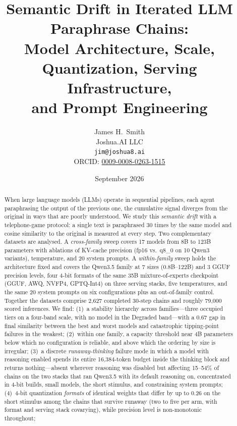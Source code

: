 \documentclass[11pt]{article}
\title{Semantic Drift in Iterated LLM Paraphrase Chains:\\
Model Architecture, Scale, Quantization, Serving Infrastructure,\\
and Prompt Engineering}
\author{
  James H.\ Smith \\
  Joshua.AI LLC \\
  \texttt{jim@joshua8.ai} \\
  ORCID: \href{https://orcid.org/0009-0008-0263-1515}{0009-0008-0263-1515}
}
\date{September 2026}
\begin{document}
\maketitle

\begin{abstract}
When large language models (LLMs) operate in sequential pipelines, each agent
paraphrasing the output of the previous one, the cumulative signal diverges
from the original in ways that are poorly understood. We study this
\emph{semantic drift} with a telephone-game protocol: a single text is
paraphrased 30 times by the same model and cosine similarity to the original
is measured at every step. Two complementary datasets are analysed. A
\emph{cross-family} sweep covers 17 models from 8B to 123B parameters with
ablations of KV-cache precision (fp16 vs.\ q8\_0 on 10 Qwen3 variants),
temperature, and 20 system prompts. A \emph{within-family} sweep holds the
architecture fixed and covers the Qwen3.5 family at 7 sizes (0.8B--122B) and
3 GGUF precision levels, four 4-bit formats of the same 35B mixture-of-experts
checkpoint (GGUF, AWQ, NVFP4, GPTQ-Int4) on three serving stacks, five
temperatures, and the same 20 system prompts on six configurations plus an
out-of-family control. Together the datasets comprise 2{,}627 completed
30-step chains and roughly 79{,}000 scored inferences.
We find:
(1)~a stability hierarchy across families---three occupied tiers on a
four-band scale, with no model in the Degraded band---with a 0.67 gap in
final similarity between the best and worst models and catastrophic
tipping-point failures in the weakest;
(2)~within one family, a capacity threshold near 4B parameters below which no
configuration is reliable, and above which the ordering by size is irregular;
(3)~a discrete \emph{runaway-thinking} failure mode in which a model with
reasoning enabled spends its entire 16{,}384-token budget inside the thinking
block and returns nothing---absent wherever reasoning was disabled but
affecting 15--54\% of chains on the two stacks that ran Qwen3.5 with its
default reasoning on, concentrated in 4-bit builds, small models, the
short stimulus, and constraining system prompts;
(4)~4-bit quantization \emph{formats} of identical weights that differ by up
to 0.26 on the short stimulus among the chains that survive runaway (two to
five per arm, with format and serving stack covarying), while precision
level is non-monotonic throughout;

\end{abstract}
\end{document}

